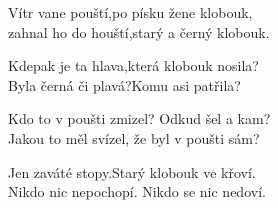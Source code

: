 

\nv{}Vítr vane pouští,\mm\nc {}po písku žene klobouk, \\
zahnal ho do houští,\nc {}starý a černý klobouk. \\
\vnv

\nv{}Kdepak je ta hlava,\mm\nc{}která klobouk nosila?\\
Byla černá či plavá?\nc{}Komu asi patřila?\\
\vnv

\nv{}Kdo to v poušti zmizel? Odkud šel a kam?\\
Jakou to měl svízel, že byl v poušti sám? \\
\vnv

\nv{}Jen zaváté stopy.\mm\nc{}Starý klobouk ve křoví.\\
Nikdo nic nepochopí. Nikdo se nic nedoví.
\newpage
